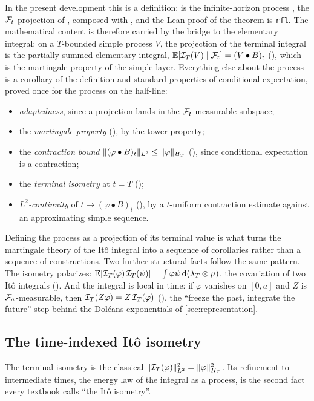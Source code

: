 \documentclass[11pt]{article}
\newcommand{\HT}{H_T}
\newcommand{\bulletB}{\mathbin{\bullet}}
\begin{document}
In the present development this is a definition:  is the infinite-horizon process
, the $\mathcal{F}_t$-projection of , composed with , and the Lean
proof of the theorem is \texttt{rfl}. The mathematical content is therefore carried by the bridge to the elementary
integral: on a $T$-bounded simple process $V$, the projection of the terminal integral is the partially summed
elementary integral, $\E[\ito_T(V)\mid\F_t]=(V\bulletB B)_t$ (), which is
the martingale property of the simple layer. Everything else about the process is a corollary of the definition and
standard properties of conditional expectation, proved once for the process on the half-line:
\begin{itemize}
\item \emph{adaptedness}, since a  projection lands in the $\mathcal{F}_t$-measurable subspace;
\item the \emph{martingale property} (), by the tower property;
\item the \emph{contraction bound} $\norm{(\varphi\bulletB B)_t}_{L^2}\le\norm{\varphi}_{\HT}$
  (), since conditional expectation is a contraction;
\item the \emph{terminal isometry} at $t=T$ ();
\item \emph{$L^2$-continuity} of $t\mapsto(\varphi\bulletB B)_t$ (),
  by a $t$-uniform contraction estimate against an approximating simple sequence.
\end{itemize}
Defining the process as a projection of its terminal value is what turns the martingale theory of the
It\^o integral into a sequence of corollaries rather than a sequence of constructions. Two further
structural facts follow the same pattern. The isometry polarizes:
$\mathbb{E}[\mathcal{I}_T(\varphi)\,\mathcal{I}_T(\psi)]=\int\varphi\psi\,\mathrm{d}(\lambda_T\otimes\mu)$, the covariation of two It\^o
integrals (). And the integral is local in time: if $\varphi$ vanishes on
$[0,a]$ and $Z$ is $\mathcal{F}_a$-measurable, then $\mathcal{I}_T(Z\varphi)=Z\,\mathcal{I}_T(\varphi)$ (),
the ``freeze the past, integrate the future'' step behind the Dol\'eans exponentials of
\cref{sec:representation}.

\subsection{The time-indexed It\^o isometry}
The terminal isometry is the classical $\norm{\ito_T(\varphi)}^2_{L^2}=\norm{\varphi}^2_{\HT}$. Its
refinement to intermediate times, the energy law of the integral as a process, is the second fact every
textbook calls ``the It\^o isometry''.
\end{document}
